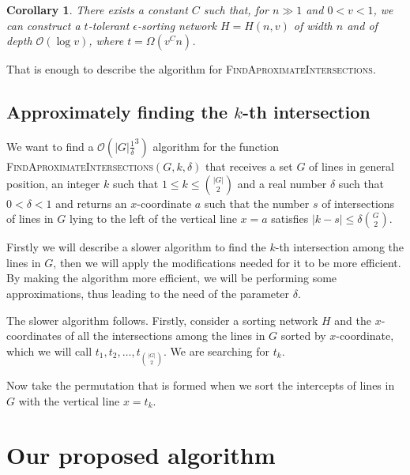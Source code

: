 \documentclass{article}
\def\bigo{\mathcal{O}}
\newtheorem{corollary}{Corollary}
\begin{document}
\begin{corollary}
There exists a constant $C$ such that, for $n \gg 1$ and $0 < v < 1$, we can
construct a $t$-tolerant $\epsilon$-sorting network $H = H(n, v)$ of width $n$ and of depth
$\bigo(\log v)$, where $t = \Omega(v^Cn)$. 
\end{corollary}

That is enough to describe the algorithm for \textsc{FindAproximateIntersections}.

\subsection{Approximately finding the $k$-th intersection}

We want to find a $\bigo(|G|\frac{1}{\delta}^3)$ algorithm for the function \textsc{FindAproximateIntersections}$(G,k,\delta)$ that receives a set $G$ of lines in general position, an integer $k$ such that $1 \leq k \leq {|G|\choose 2}$ and a real number $\delta$ such that $0 < \delta < 1$ and returns an $x$-coordinate $a$ such that the number $s$ of intersections of lines in $G$ lying to the left of the vertical line $x=a$ satisfies $|k-s|\leq \delta {G \choose 2}$.

Firstly we will describe a slower algorithm to find the $k$-th intersection among the lines in $G$, then we will apply the modifications needed for it to be more efficient. By making the algorithm more efficient, we will be performing some approximations, thus leading to the need of the parameter $\delta$.

The slower algorithm follows. Firstly, consider a sorting network $H$ and the $x$-coordinates of all the intersections among the lines in $G$ sorted by $x$-coordinate, which we will call $t_1, t_2, \dots, t_{|G| \choose 2}$. We are searching for $t_k$.

Now take the permutation that is formed when we sort the intercepts of lines in $G$ with the vertical line $x=t_k$. 


\newpage
\section{Our proposed algorithm}
\end{document}
